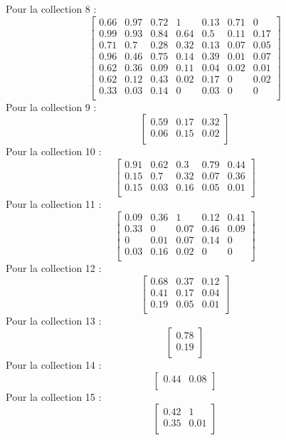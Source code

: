 Pour la collection 8 :
\[\begin{bmatrix} 0.66 &0.97 &0.72 &1 &0.13 &0.71 &0 \\0.99 &0.93 &0.84 &0.64 &0.5 &0.11 &0.17 \\0.71 &0.7 &0.28 &0.32 &0.13 &0.07 &0.05 \\0.96 &0.46 &0.75 &0.14 &0.39 &0.01 &0.07 \\0.62 &0.36 &0.09 &0.11 &0.04 &0.02 &0.01 \\0.62 &0.12 &0.43 &0.02 &0.17 &0 &0.02 \\0.33 &0.03 &0.14 &0 &0.03 &0 &0 \\ \end{bmatrix}\]
Pour la collection 9 :
\[\begin{bmatrix} 0.59 &0.17 &0.32 \\0.06 &0.15 &0.02 \\ \end{bmatrix}\]
Pour la collection 10 :
\[\begin{bmatrix} 0.91 &0.62 &0.3 &0.79 &0.44 \\0.15 &0.7 &0.32 &0.07 &0.36 \\0.15 &0.03 &0.16 &0.05 &0.01 \\ \end{bmatrix}\]
Pour la collection 11 :
\[\begin{bmatrix} 0.09 &0.36 &1 &0.12 &0.41 \\0.33 &0 &0.07 &0.46 &0.09 \\0 &0.01 &0.07 &0.14 &0 \\0.03 &0.16 &0.02 &0 &0 \\ \end{bmatrix}\]
Pour la collection 12 :
\[\begin{bmatrix} 0.68 &0.37 &0.12 \\0.41 &0.17 &0.04 \\0.19 &0.05 &0.01 \\ \end{bmatrix}\]
Pour la collection 13 : \[\begin{bmatrix} 0.78 \\0.19 \\ \end{bmatrix}\]
Pour la collection 14 : \[\begin{bmatrix} 0.44 &0.08 \\ \end{bmatrix}\]
Pour la collection 15 :
\[\begin{bmatrix} 0.42 &1 \\0.35 &0.01 \\ \end{bmatrix}\]

